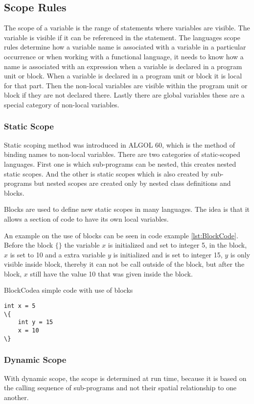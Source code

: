 \subsection{Scope Rules}
The scope of a variable is the range of statements where variables are visible. The variable is visible if it can be referenced in the statement.
The languages scope rules determine how a variable name is associated with a variable in a particular occurrence or when working with a functional language, it needs to know how a name is associated with an expression when a variable is declared in a program unit or block. When a variable is declared in a program unit or block it is local for that part. Then the non-local variables are visible within the program unit or block if they are not declared there. Lastly there are global variables these are a special category of non-local variables.

\subsubsection{Static Scope}
Static scoping method was introduced in ALGOL 60, which is the method of binding names to non-local variables. There are two categories of static-scoped languages. First one is which sub-programs can be nested, this creates nested static scopes. And the other is static scopes which is also created by sub-programs but nested scopes are created only by nested class definitions and blocks.

Blocks are used to define new static scopes in many languages. The idea is that it allows a section of code to have its own local variables.

An example on the use of blocks can be seen in code example \ref{lst:BlockCode}. Before the block $\{ \}$ the variable $x$ is initialized and set to integer 5, in the block, $x$ is set to 10 and a extra variable $y$ is initialized and is set to integer 15, $y$ is only visible inside block, thereby it can not be call outside of the block, but after the block, $x$ still have the value 10 that was given inside the block.

\begin{code}{BlockCode}{a simple code with use of blocks}
\begin{lstlisting}
int x = 5
\{
    int y = 15
    x = 10
\} 
\end{lstlisting}
\end{code}

\subsubsection{Dynamic Scope}
With dynamic scope, the scope is determined at run time, because it is based on the calling sequence of sub-programs and not their spatial relationship to one another.

